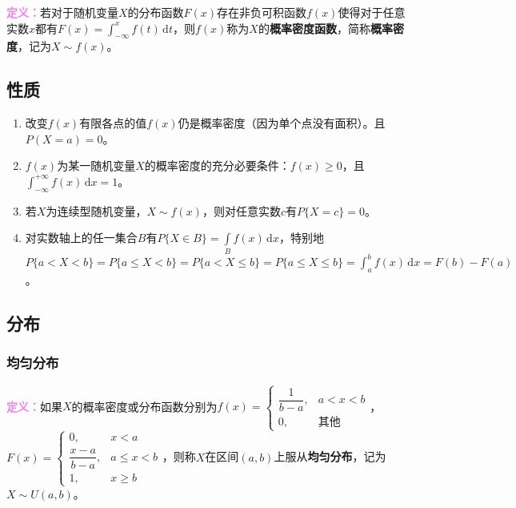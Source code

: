 \textcolor{violet}{\textbf{定义：}}若对于随机变量$X$的分布函数$F(x)$存在非负可积函数$f(x)$使得对于任意实数$x$都有$F(x)=\int_{-\infty}^xf(t)\,\textrm{d}t$，则$f(x)$称为$X$的\textbf{概率密度函数}，简称\textbf{概率密度}，记为$X\sim f(x)$。

\subsection{性质}

\begin{enumerate}
    \item 改变$f(x)$有限各点的值$f(x)$仍是概率密度（因为单个点没有面积）。且$P(X=a)=0$。
    \item $f(x)$为某一随机变量$X$的概率密度的充分必要条件：$f(x)\geqslant0$，且\\$\int_{-\infty}^{+\infty}f(x)\,\textrm{d}x=1$。
    \item 若$X$为连续型随机变量，$X\sim f(x)$，则对任意实数$c$有$P\{X=c\}=0$。
    \item 对实数轴上的任一集合$B$有$P\{X\in B\}=\int\limits_Bf(x)\,\textrm{d}x$，特别地$P\{a<X<b\}=P\{a\leqslant X<b\}=P\{a<X\leqslant b\}=P\{a\leqslant X\leqslant b\}=\int_a^bf(x)\,\textrm{d}x=F(b)-F(a)$。
\end{enumerate}

\subsection{分布}

\subsubsection{均匀分布}

\textcolor{violet}{\textbf{定义：}}如果$X$的概率密度或分布函数分别为$f(x)=\left\{\begin{array}{ll}
    \dfrac{1}{b-a}, & a<x<b \\
    0, & \text{其他}
\end{array}\right.$，$F(x)=\left\{\begin{array}{ll}
    0, & x<a \\
    \dfrac{x-a}{b-a}, & a\leqslant x<b \\
    1, & x\geqslant b
\end{array}\right.$，则称$X$在区间$(a,b)$上服从\textbf{均匀分布}，记为$X\sim U(a,b)$。

